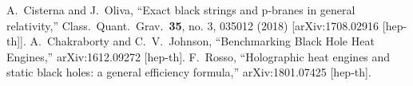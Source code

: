 \documentclass[preprint,showpacs,showkeys,onecolumn,nofootinbib]{revtex4}
\begin{document}
\begin{thebibliography}{99}
  A.~Cisterna and J.~Oliva,
  ``Exact black strings and p-branes in general relativity,''
  Class.\ Quant.\ Grav.\  {\bf 35}, no. 3, 035012 (2018)
  [arXiv:1708.02916 [hep-th]].
  A.~Chakraborty and C.~V.~Johnson,
  ``Benchmarking Black Hole Heat Engines,''
  arXiv:1612.09272 [hep-th].
  F.~Rosso,
  ``Holographic heat engines and static black holes: a general efficiency formula,''
  arXiv:1801.07425 [hep-th].



\end{thebibliography}
\end{document}
